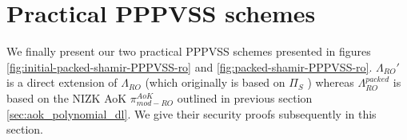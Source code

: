 % 

\section{Practical PPPVSS schemes}
\label{sec:practical-pppvss}
We finally present our two practical PPPVSS schemes presented in figures \ref{fig:initial-packed-shamir-PPPVSS-ro} and 
\ref{fig:packed-shamir-PPPVSS-ro}. $\Lambda_{RO}'$ is a direct extension of $\Lambda_{RO}$ \cite{cryptoeprint:2025/576} 
(which originally is based on $\Pi_S$ \cite{cryptoeprint:2023/1669}) whereas $\Lambda_{RO}^{packed}$ is 
based on the NIZK AoK $\pi_{mod-RO}^{AoK}$ outlined in previous section \ref{sec:aok_polynomial_dl}. We give their 
security proofs subsequently in this section. 





% 


